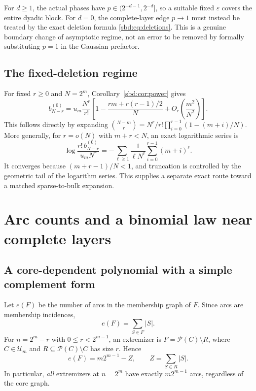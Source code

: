 \documentclass[11pt,a4paper]{article}
\theoremstyle{definition}
\newcommand{\PP}{\mathcal P}
\newcommand{\U}{\mathcal U}
\begin{document}
For $d\ge1$, the actual phases have
$p\in(2^{-d-1},2^{-d}]$, so a suitable fixed $\varepsilon$ covers the
entire dyadic block. For $d=0$, the complete-layer edge $p\to1$ must
instead be treated by the exact deletion formula
\eqref{sbd:eq:deletions}. This is a genuine boundary change of asymptotic
regime, not an error to be removed by formally substituting $p=1$ in
the Gaussian prefactor.

\subsection{The fixed-deletion regime}
For fixed $r\ge0$ and $N=2^m$, Corollary~\ref{sbd:cor:power} gives
\begin{equation}\label{sbd:eq:fixedr}
 b_{N-r}^{(0)}
 =u_m\frac{N^r}{r!}
 \left[1-\frac{rm+r(r-1)/2}{N}
          +O_r\left(\frac{m^2}{N^2}\right)\right].
\end{equation}
This follows directly by expanding
$\binom{N-m}{r}=N^r/r!\prod_{i=0}^{r-1}(1-(m+i)/N)$.
More generally, for $r=o(N)$ with $m+r<N$, an exact logarithmic series is
\begin{equation}\label{sbd:eq:deletion-series}
 \log\frac{r!\,b_{N-r}^{(0)}}{u_mN^r}
 =-\sum_{\ell\ge1}\frac{1}{\ell N^\ell}
       \sum_{i=0}^{r-1}(m+i)^\ell.
\end{equation}
It converges because $(m+r-1)/N<1$, and truncation is controlled by the
geometric tail of the logarithm series. This supplies a separate exact
route toward a matched sparse-to-bulk expansion.

\section{Arc counts and a binomial law near complete layers}

\subsection{A core-dependent polynomial with a simple complement form}
Let $e(F)$ be the number of arcs in the membership graph of $F$.
Since arcs are membership incidences,
\[
 e(F)=\sum_{S\in F}|S|.
\]
For $n=2^m-r$ with $0\le r<2^{m-1}$, an extremizer is
$F=\PP(C)\setminus R$, where $C\in\U_m$ and
$R\subseteq\PP(C)\setminus C$ has size $r$. Hence
\begin{equation}\label{sbd:eq:arc-deficit}
 e(F)=m2^{m-1}-Z,\qquad Z=\sum_{S\in R}|S|.
\end{equation}
In particular, \emph{all} extremizers at $n=2^m$ have exactly
$m2^{m-1}$ arcs, regardless of the core graph.
\end{document}

